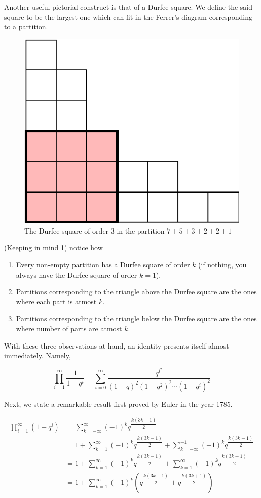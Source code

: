 Another useful pictorial construct is that of a Durfee square. We define the said square to be the largest one which can fit in the Ferrer’s diagram corresponding to a partition.
\begin{figure}[H]
    \centering
    \includegraphics[width=0.5\linewidth]{Images/Figure19.png}
    \caption{The Durfee square of order $3$ in the partition $7+5+3+2+2+1$}
    \label{DurfeeExample}
\end{figure}
(Keeping in mind \cref{DurfeeExample}) notice how
\begin{enumerate}
    \item Every non-empty partition has a Durfee square of order $k$ (if nothing, you always have the Durfee square of order $k=1$).
    \item Partitions corresponding to the triangle above the Durfee square are the ones where each part is atmost $k$.
    \item Partitions corresponding to the triangle below the Durfee square are the ones where number of parts are atmost $k$. 
\end{enumerate}
With these three observations at hand, an identity presents itself almost immediately. Namely,
\begin{claim}
    \[
    \prod_{i=1}^{\infty}\dfrac{1}{1-q^i} = \sum_{i=0}^{\infty}\dfrac{q^{i^2}}{(1-q)^2(1-q^2)^2\cdots(1-q^i)^2}
    \]
    \label{c:DurfeeId1}
\end{claim}
Next, we state a remarkable result first proved by Euler in the year 1785.
\begin{theorem}
\begin{align*}
\prod_{i=1}^{\infty}(1-q^i) &= \sum_{k=-\infty}^{\infty}(-1)^k q^{\dfrac{k(3k-1)}{2}} \\
&= 1+\sum_{k=1}^{\infty}(-1)^kq^{\dfrac{k(3k-1)}{2}}+\sum_{k=-\infty}^{-1}(-1)^kq^{\dfrac{k(3k-1)}{2}} \\
&= 1+\sum_{k=1}^{\infty}(-1)^kq^{\dfrac{k(3k-1)}{2}}+\sum_{k=1}^{\infty}(-1)^kq^{\dfrac{k(3k+1)}{2}} \\
&= 1+\sum_{k=1}^{\infty}(-1)^k \left(q^{\dfrac{k(3k-1)}{2}}+q^{\dfrac{k(3k+1)}{2}}\right) \\
\end{align*}
\label{t:EPT}
\end{theorem}

